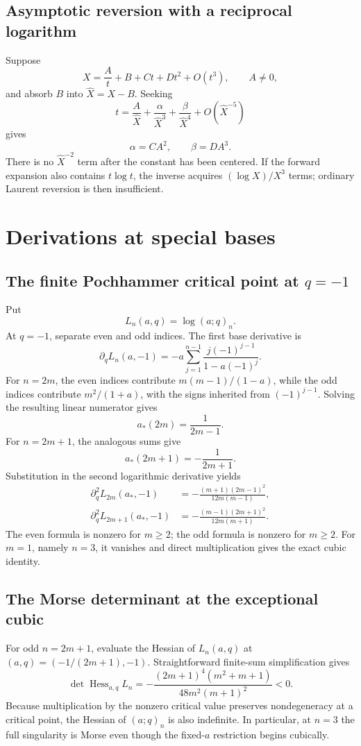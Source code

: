 \documentclass[11pt,letterpaper,oneside,openany]{book}
\theoremstyle{definition}
\theoremstyle{remark}
\begin{document}
\section{Asymptotic reversion with a reciprocal logarithm}
Suppose
\[
 X=\frac At+B+Ct+Dt^2+O(t^3),
 \qquad A\ne0,
\]
and absorb \(B\) into \(\widehat X=X-B\).  Seeking
\[
 t=\frac A{\widehat X}+\frac{\alpha}{\widehat X^3}
 +\frac{\beta}{\widehat X^4}+O(\widehat X^{-5})
\]
gives
\begin{equation}\label{eq:reciprocal-log-reversion}
 \alpha=CA^2,
 \qquad
 \beta=DA^3.
\end{equation}
There is no \(\widehat X^{-2}\) term after the constant has been centered.  If
the forward expansion also contains \(t\log t\), the inverse acquires
\((\log X)/X^3\) terms; ordinary Laurent reversion is then insufficient.

\chapter{Derivations at special bases}

\section{The finite Pochhammer critical point at \texorpdfstring{\(q=-1\)}{q=-1}}
Put
\[
 L_n(a,q)=\log(a;q)_n.
\]
At \(q=-1\), separate even and odd indices.  The first base derivative is
\[
 \partial_qL_n(a,-1)
 =-a\sum_{j=1}^{n-1}\frac{j(-1)^{j-1}}
 {1-a(-1)^j}.
\]
For \(n=2m\), the even indices contribute
\(m(m-1)/(1-a)\), while the odd indices contribute
\(m^2/(1+a)\), with the signs inherited from \((-1)^{j-1}\).  Solving the
resulting linear numerator gives
\[
 a_*(2m)=\frac1{2m-1}.
\]
For \(n=2m+1\), the analogous sums give
\[
 a_*(2m+1)=-\frac1{2m+1}.
\]
Substitution in the second logarithmic derivative yields
\begin{align}
 \partial_q^2L_{2m}(a_*,-1)
 &=-\frac{(m+1)(2m-1)^2}{12m(m-1)},\label{eq:even-qminusone-L2}\\
 \partial_q^2L_{2m+1}(a_*,-1)
 &=-\frac{(m-1)(2m+1)^2}{12m(m+1)}.\label{eq:odd-qminusone-L2}
\end{align}
The even formula is nonzero for \(m\ge2\); the odd formula is nonzero for
\(m\ge2\).  For \(m=1\), namely \(n=3\), it vanishes and direct multiplication
gives the exact cubic identity.

\section{The Morse determinant at the exceptional cubic}
For odd \(n=2m+1\), evaluate the Hessian of
\(L_n(a,q)\) at \((a,q)=(-1/(2m+1),-1)\).  Straightforward finite-sum
simplification gives
\begin{equation}\label{eq:odd-morse-determinant}
 \det\operatorname{Hess}_{a,q}L_n
 =-\frac{(2m+1)^4(m^2+m+1)}
 {48m^2(m+1)^2}<0.
\end{equation}
Because multiplication by the nonzero critical value preserves
nondegeneracy at a critical point, the Hessian of \((a;q)_n\) is also
indefinite.  In particular, at \(n=3\) the full singularity is Morse even though
the fixed-\(a\) restriction begins cubically.
\end{document}
